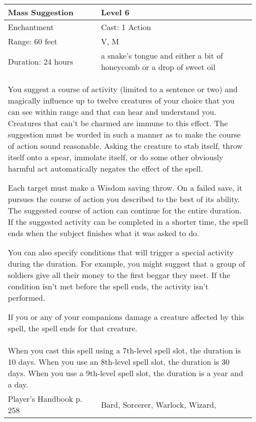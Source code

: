 \documentclass[11pt]{report}
\begin{document}
\begin{table}[H]
	\begin{tabular}{||p{6cm}|p{6cm}||}
		\hline\hline
		\bf{Mass Suggestion} & Level 6\\ \hline
		Enchantment & Cast: 1 Action\\ \hline
		Range: 60 feet & V, M\\ \hline
		Duration: 24 hours & a snake’s tongue and either a bit of honeycomb or a drop of sweet oil\\ \hline
		\multicolumn{2}{||p{12cm}||}{You suggest a course of activity (limited to a sentence or two) and magically influence up to twelve creatures of your choice that you can see within range and that can hear and understand you.
Creatures that can’t be charmed are immune to this effect. The suggestion must be worded in such a manner as to make the course of action sound reasonable. Asking the creature to stab itself, throw itself onto a spear, immolate itself, or do some other obviously harmful act automatically negates the effect of the spell.

Each target must make a Wisdom saving throw. On a failed save, it pursues the course of action you described to the best of its ability. The suggested course of action can continue for the entire duration. If the suggested activity can be completed in a shorter time, the spell ends when the subject finishes what it was asked to do.

You can also specify conditions that will trigger a special activity during the duration. For example, you might suggest that a group of soldiers give all their money to the first beggar they meet. If the condition isn’t met before the spell ends, the activity isn’t performed.

If you or any of your companions damage a creature affected by this spell, the spell ends for that creature.}\\ \hline
		\multicolumn{2}{||p{12cm}||}{When you cast this spell using a 7th-level spell slot, the duration is 10 days.
When you use an 8th-level spell slot, the duration is 30 days.
When you use a 9th-level spell slot, the duration is a year and a day.}\\ \hline
Player's Handbook p. 258 & Bard, Sorcerer, Warlock, Wizard, \\ \hline\hline
	\end{tabular}
\end{table}
\end{document}
